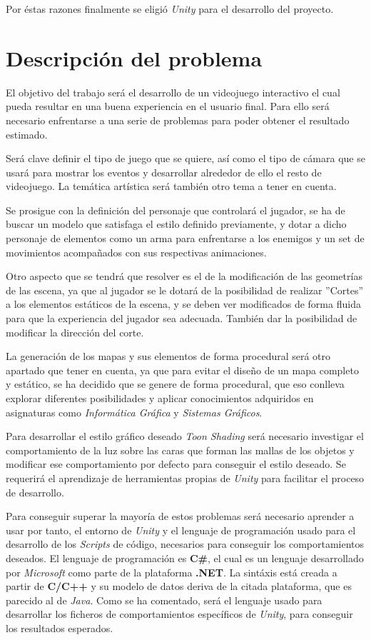 Por éstas razones finalmente se eligió \textit{Unity} para el desarrollo del proyecto.

\section{Descripción del problema}

El objetivo del trabajo será el desarrollo de un videojuego interactivo el cual pueda resultar en una buena experiencia en el usuario final. Para ello será necesario enfrentarse a una serie de problemas para poder obtener el resultado estimado.

Será clave definir el tipo de juego que se quiere, así como el tipo de cámara que se usará para mostrar los eventos y desarrollar alrededor de ello el resto de videojuego. La temática artística será también otro tema a tener en cuenta.

Se prosigue con la definición del personaje que controlará el jugador, se ha de buscar un modelo que satisfaga el estilo definido previamente, y dotar a dicho personaje de elementos como un arma para enfrentarse a los enemigos y un set de movimientos acompañados con sus respectivas animaciones.

Otro aspecto que se tendrá que resolver es el de la modificación de las geometrías de las escena, ya que al jugador se le dotará de la posibilidad de realizar ''Cortes'' a los elementos estáticos de la escena, y se deben ver modificados de forma fluida para que la experiencia del jugador sea adecuada. También dar la posibilidad de modificar la dirección del corte.

La generación de los mapas y sus elementos de forma procedural será otro apartado que tener en cuenta, ya que para evitar el diseño de un mapa completo y estático, se ha decidido que se genere de forma procedural, que eso conlleva explorar diferentes posibilidades y aplicar conocimientos adquiridos en asignaturas como \textit{Informática Gráfica} y \textit{Sistemas Gráficos}.

Para desarrollar el estilo gráfico deseado \textit{Toon Shading} será necesario investigar el comportamiento de la luz sobre las caras que forman las mallas de los objetos y modificar ese comportamiento por defecto para conseguir el estilo deseado. Se requerirá el aprendizaje de herramientas propias de \textit{Unity} para facilitar el proceso de desarrollo.

Para conseguir superar la mayoría de estos problemas será necesario aprender a usar por tanto, el entorno de \textit{Unity} y el lenguaje de programación usado para el desarrollo de los \textit{Scripts} de código, necesarios para conseguir los comportamientos deseados. El lenguaje de programación es \textbf{C\#}, el cual es un lenguaje desarrollado por \textit{Microsoft} como parte de la plataforma \textbf{.NET}. La sintáxis está creada a partir de \textbf{C/C++} y su modelo de datos deriva de la citada plataforma, que es parecido al de \textit{Java}. Como se ha comentado, será el lenguaje usado para desarrollar los ficheros de comportamientos específicos de \textit{Unity}, para conseguir los resultados esperados.

